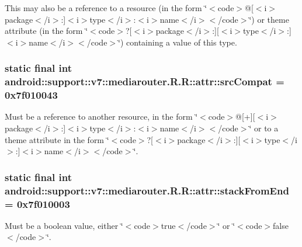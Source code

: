 This may also be a reference to a resource (in the form \char`\"{}$<$code$>$@\mbox{[}$<$i$>$package$<$/i$>$:\mbox{]}$<$i$>$type$<$/i$>$:$<$i$>$name$<$/i$>$$<$/code$>$\char`\"{}) or theme attribute (in the form \char`\"{}$<$code$>$?\mbox{[}$<$i$>$package$<$/i$>$:\mbox{]}\mbox{[}$<$i$>$type$<$/i$>$:\mbox{]}$<$i$>$name$<$/i$>$$<$/code$>$\char`\"{}) containing a value of this type. \hypertarget{classandroid_1_1support_1_1v7_1_1mediarouter_1_1_r_1_1attr_5589cebe774f1a61b20c589ed625b407}{
\subsubsection[{srcCompat}]{\setlength{\rightskip}{0pt plus 5cm}static final int android::support::v7::mediarouter.R.R::attr::srcCompat = 0x7f010043}}
\label{classandroid_1_1support_1_1v7_1_1mediarouter_1_1_r_1_1attr_5589cebe774f1a61b20c589ed625b407}


Must be a reference to another resource, in the form \char`\"{}$<$code$>$@\mbox{[}+\mbox{]}\mbox{[}$<$i$>$package$<$/i$>$:\mbox{]}$<$i$>$type$<$/i$>$:$<$i$>$name$<$/i$>$$<$/code$>$\char`\"{} or to a theme attribute in the form \char`\"{}$<$code$>$?\mbox{[}$<$i$>$package$<$/i$>$:\mbox{]}\mbox{[}$<$i$>$type$<$/i$>$:\mbox{]}$<$i$>$name$<$/i$>$$<$/code$>$\char`\"{}. \hypertarget{classandroid_1_1support_1_1v7_1_1mediarouter_1_1_r_1_1attr_bcef09ddc6e59415907bac65a2a49887}{
\subsubsection[{stackFromEnd}]{\setlength{\rightskip}{0pt plus 5cm}static final int android::support::v7::mediarouter.R.R::attr::stackFromEnd = 0x7f010003}}
\label{classandroid_1_1support_1_1v7_1_1mediarouter_1_1_r_1_1attr_bcef09ddc6e59415907bac65a2a49887}


Must be a boolean value, either \char`\"{}$<$code$>$true$<$/code$>$\char`\"{} or \char`\"{}$<$code$>$false$<$/code$>$\char`\"{}. 

